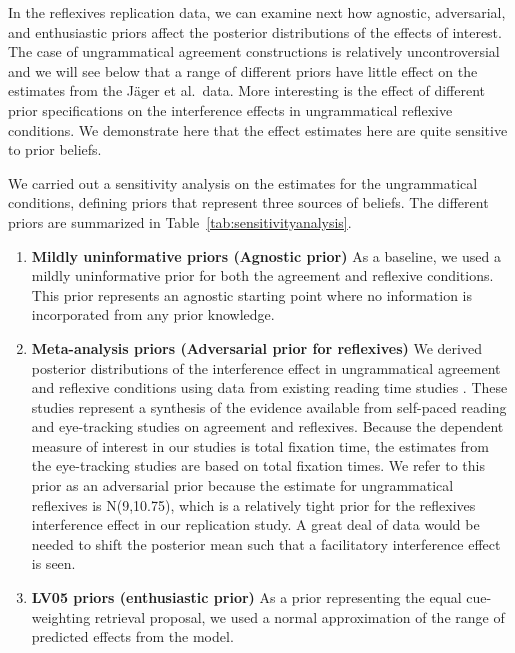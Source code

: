 \documentclass{cambridge7A}\usepackage[]{graphicx}\usepackage[]{color}
\begin{document}
In the reflexives replication data, 
we can examine next how agnostic, adversarial, and enthusiastic priors affect the posterior distributions of the effects of interest. 
The case of ungrammatical agreement constructions is relatively uncontroversial and we will see below that a range of different priors have little effect on the estimates from the J\"ager et al.\ data. 
More interesting is the effect of different prior specifications on the interference effects in ungrammatical reflexive conditions. We demonstrate here that the effect estimates here are quite sensitive to prior beliefs.

We carried out a sensitivity analysis on the estimates for the  ungrammatical conditions, defining priors that represent three sources of beliefs. The different priors are summarized in Table~\ref{tab:sensitivityanalysis}. 

\begin{enumerate}
\item \textbf{Mildly uninformative priors (Agnostic prior)} As a baseline, we used a mildly uninformative prior for both the agreement and reflexive conditions. This prior represents an agnostic starting point where no information is incorporated from any prior knowledge.
\item \textbf{Meta-analysis priors (Adversarial prior for reflexives)}
We derived posterior distributions of the interference effect in ungrammatical agreement and reflexive conditions using data from existing reading time studies \citep{JaegerEngelmannVasishth2017}. These studies represent a synthesis of the evidence available from self-paced reading and eye-tracking studies on agreement and reflexives. Because the dependent measure of interest in our studies is total fixation time, the estimates from the eye-tracking studies are based on total fixation times. We refer to this prior as an adversarial prior because the estimate for ungrammatical reflexives is N(9,10.75), which is a relatively tight prior for the reflexives interference effect in our replication study.  A great deal of data would be needed to shift the posterior mean such that a facilitatory interference effect is seen. 
\item \textbf{LV05 priors (enthusiastic prior)} As a prior representing the equal cue-weighting retrieval proposal, we used a normal approximation of the range of predicted effects from the \cite{EngelmannJaegerVasishth2019} model. 
\end{enumerate}
\end{document}
